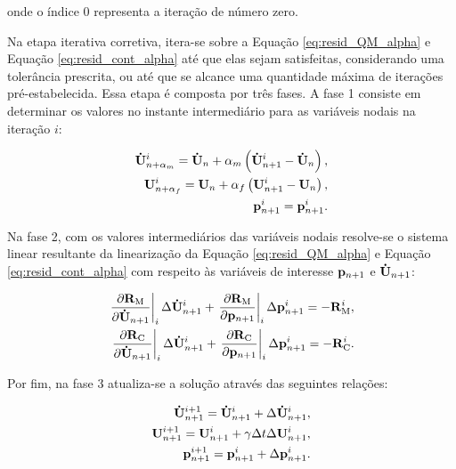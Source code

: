 \noindent onde o índice $0$ representa a iteração de número zero. 

Na etapa iterativa corretiva, itera-se sobre a Equação \eqref{eq:resid_QM_alpha} e Equação \eqref{eq:resid_cont_alpha} até que elas sejam satisfeitas, considerando uma tolerância prescrita, ou até que se alcance uma quantidade máxima de iterações pré-estabelecida. Essa etapa é composta por três fases. A fase 1 consiste em determinar os valores no instante intermediário para as variáveis nodais na iteração $i$:

\begin{align}
\mathbf{\dot{U}}_{n+\alpha_m}^{i} = \mathbf{\dot{U}}_n + \alpha_m \left( \mathbf{\dot{U}}_{n+1}^{i} - \mathbf{\dot{U}}_n \right), \label{eq:inter_acel_i}\\
\mathbf{U}_{n+\alpha_f}^{i} = \mathbf{U}_n + \alpha_f \left( \mathbf{U}_{n+1}^{i} - \mathbf{U}_n \right), \label{eq:inter_vel_i}\\
\mathbf{p}_{n+1}^{i} = \mathbf{p}_{n+1}^{i} \label{eq:inter_press_i}.
\end{align}

Na fase 2, com os valores intermediários das variáveis nodais resolve-se o sistema linear resultante da linearização da Equação \eqref{eq:resid_QM_alpha} e Equação \eqref{eq:resid_cont_alpha} com respeito às variáveis de interesse $\mathbf{p}_{n+1}$ e $\mathbf{\dot{U}}_{n+1}$:

\begin{align}
\left .\frac{\partial\mathbf{R}_\mathrm{M}}{\partial\mathbf{\dot{U}}_{n+1}}\right|_{i} \Delta \mathbf{\dot{U}}_{n+1}^{i} + \left .\frac{\partial\mathbf{R}_\mathrm{M}}{\partial\mathbf{p}_{n+1}}\right|_{i} \Delta \mathbf{p}_{n+1}^{i} = -\mathbf{R}_\mathrm{M}^{i}, \label{eq:eq_lin_QM} \\
\left .\frac{\partial\mathbf{R}_\mathrm{C}}{\partial\mathbf{\dot{U}}_{n+1}}\right|_{i} \Delta \mathbf{\dot{U}}_{n+1}^{i} + \left .\frac{\partial\mathbf{R}_\mathrm{C}}{\partial\mathbf{p}_{n+1}}\right|_{i} \Delta \mathbf{p}_{n+1}^{i} = -\mathbf{R}_\mathrm{C}^{i}.\label{eq:eq_lin_cont}
\end{align}

Por fim, na fase 3 atualiza-se a solução através das seguintes relações:

\begin{align}
\mathbf{\dot{U}}_{n+1}^{i+1} = \mathbf{\dot{U}}_{n+1}^{i} + \Delta\mathbf{\dot{U}}_{n+1}^{i},\label{eq:atu_acel} \\ 
\mathbf{U}_{n+1}^{i+1} = \mathbf{U}_{n+1}^{i} + \gamma \Delta t \Delta\mathbf{U}_{n+1}^{i},\label{eq:atu_vel}\\
\mathbf{p}_{n+1}^{i+1} = \mathbf{p}_{n+1}^{i} + \Delta\mathbf{p}_{n+1}^{i}.\label{eq:atu_press}
\end{align}

